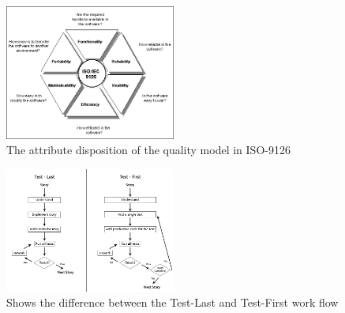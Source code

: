 \begin{figure}[htb!]
\centering
	\includegraphics[width=0.5\textwidth]{9126ref.png}
\caption{The attribute disposition of the quality model in ISO-9126}
\label{fig:isoPic}
\end{figure}

\begin{figure}[htb!]
\centering
	\includegraphics[width=0.5\textwidth]{tdd.png}
\caption{Shows the difference between the Test-Last and Test-First work flow}
\label{fig:tddPic}
\end{figure}